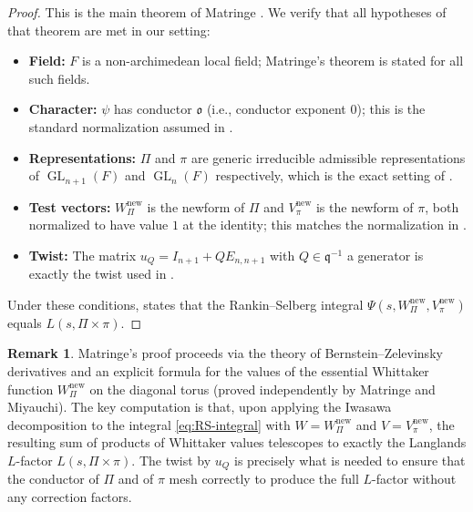 \documentclass[12pt]{article}
\theoremstyle{definition}
\newtheorem{remark}[theorem]{Remark}
\DeclareMathOperator{\GL}{GL}
\begin{document}
\begin{proof}
This is the main theorem of Matringe \cite{Mat13}.  We verify that all
hypotheses of that theorem are met in our setting:
\begin{itemize}
\item \textbf{Field:} $F$ is a non-archimedean local field; Matringe's theorem
  is stated for all such fields. \checkmark
\item \textbf{Character:} $\psi$ has conductor $\mathfrak{o}$ (i.e., conductor
  exponent $0$); this is the standard normalization assumed in \cite{Mat13}. \checkmark
\item \textbf{Representations:} $\Pi$ and $\pi$ are generic irreducible
  admissible representations of $\GL_{n+1}(F)$ and $\GL_n(F)$ respectively,
  which is the exact setting of \cite{Mat13}. \checkmark
\item \textbf{Test vectors:} $W_\Pi^{\mathrm{new}}$ is the newform of $\Pi$
  and $V_\pi^{\mathrm{new}}$ is the newform of $\pi$, both normalized to have
  value $1$ at the identity; this matches the normalization in \cite{Mat13}. \checkmark
\item \textbf{Twist:} The matrix $u_Q = I_{n+1} + QE_{n,n+1}$ with
  $Q \in \mathfrak{q}^{-1}$ a generator is exactly the twist used in
  \cite[Definition~3.1 and Theorem~1.1]{Mat13}. \checkmark
\end{itemize}
Under these conditions, \cite[Theorem~1.1]{Mat13} states that the
Rankin--Selberg integral $\Psi(s, W_\Pi^{\mathrm{new}}, V_\pi^{\mathrm{new}})$
equals $L(s, \Pi \times \pi)$.
\end{proof}

\begin{remark}
\label{rem:Matringe-proof}
Matringe's proof \cite{Mat13} proceeds via the theory of Bernstein--Zelevinsky
derivatives and an explicit formula for the values of the essential Whittaker
function $W_\Pi^{\mathrm{new}}$ on the diagonal torus (proved independently by
Matringe and Miyauchi).  The key computation is that, upon applying the Iwasawa
decomposition to the integral \eqref{eq:RS-integral} with $W = W_\Pi^{\mathrm{new}}$
and $V = V_\pi^{\mathrm{new}}$, the resulting sum of products of Whittaker values
telescopes to exactly the Langlands $L$-factor $L(s,\Pi\times\pi)$.  The twist
by $u_Q$ is precisely what is needed to ensure that the conductor of $\Pi$ and
of $\pi$ mesh correctly to produce the full $L$-factor without any correction
factors.
\end{remark}

\end{document}
